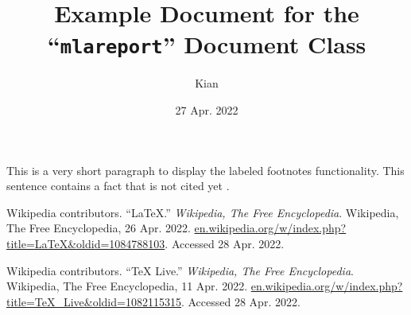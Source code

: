 \documentclass{mlareport}
\title{Example Document for the ``\texttt{mlareport}'' Document Class}
\author{Kian}{Kasad} %
\date{27 Apr. 2022}
\begin{document}
\makeheading
\maketitle

\lipsum[1-3]


This is a very short paragraph to display the labeled footnotes
functionality. This sentence contains a fact that is not
cited yet \needcite.

\lipsum[4-7]

\begin{workscited}

\wcentry
	Wikipedia contributors.
	``LaTeX.''
	\textit{Wikipedia, The Free Encyclopedia}.
	Wikipedia, The Free Encyclopedia,
	26 Apr. 2022.
	\url{en.wikipedia.org/w/index.php?title=LaTeX&oldid=1084788103}.
	Accessed 28 Apr. 2022.

\wcentry
	Wikipedia contributors.
	``TeX Live.''
	\textit{Wikipedia, The Free Encyclopedia}.
	Wikipedia, The Free Encyclopedia,
	11 Apr. 2022.
	\url{en.wikipedia.org/w/index.php?title=TeX_Live&oldid=1082115315}.
	Accessed 28 Apr. 2022.

\end{workscited}
\end{document}
